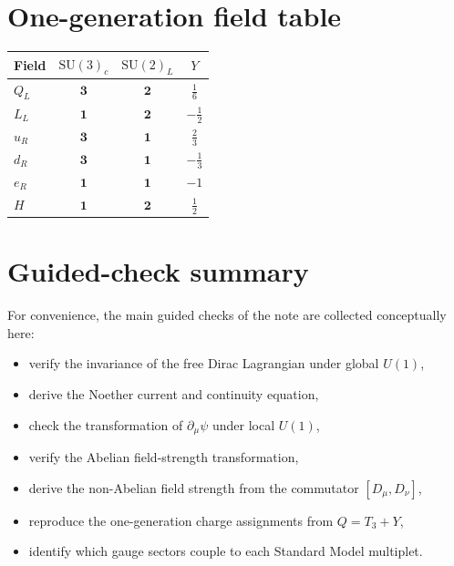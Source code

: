 \documentclass[11pt,a4paper]{article}
\newcommand{\p}{\partial}
\newcommand{\SUc}{\mathrm{SU}(3)_c}
\newcommand{\SUw}{\mathrm{SU}(2)_L}
\begin{document}
\section{One-generation field table}


\begin{center}
\begin{tabular}{>{\raggedright\arraybackslash}p{}ccc}
\toprule
Field & \(\SUc\) & \(\SUw\) & \(Y\) \\
\midrule
\(Q_L\) & \(\mathbf{3}\) & \(\mathbf{2}\) & \(\frac16\) \\
\(L_L\) & \(\mathbf{1}\) & \(\mathbf{2}\) & \(-\frac12\) \\
\(u_R\) & \(\mathbf{3}\) & \(\mathbf{1}\) & \(\frac23\) \\
\(d_R\) & \(\mathbf{3}\) & \(\mathbf{1}\) & \(-\frac13\) \\
\(e_R\) & \(\mathbf{1}\) & \(\mathbf{1}\) & \(-1\) \\
\(H\) & \(\mathbf{1}\) & \(\mathbf{2}\) & \(\frac12\) \\
\bottomrule
\end{tabular}
\end{center}



\section{Guided-check summary}

For convenience, the main guided checks of the note are collected conceptually here:
\begin{itemize}[leftmargin=1.7em]
    \item verify the invariance of the free Dirac Lagrangian under global \(U(1)\),
    \item derive the Noether current and continuity equation,
    \item check the transformation of \(\p_\mu\psi\) under local \(U(1)\),
    \item verify the Abelian field-strength transformation,
    \item derive the non-Abelian field strength from the commutator \([D_\mu,D_\nu]\),
    \item reproduce the one-generation charge assignments from \(Q=T_3+Y\),
    \item identify which gauge sectors couple to each Standard Model multiplet.
\end{itemize}
\end{document}
